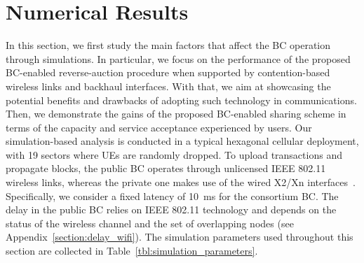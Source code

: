 \documentclass[conference]{IEEEtran}
\theoremstyle{definition}
\begin{document}

\section{Numerical Results}
\label{section:results}

In this section, we first study the main factors that affect the BC operation through simulations. In particular, we focus on the performance of the proposed BC-enabled reverse-auction procedure when supported by contention-based wireless links and backhaul interfaces. With that, we aim at showcasing the potential benefits and drawbacks of adopting such technology in communications. Then, we demonstrate the gains of the proposed BC-enabled sharing scheme in terms of the capacity and service acceptance experienced by users. Our simulation-based analysis is conducted in a typical hexagonal cellular deployment, with 19 sectors
where UEs are randomly dropped. To upload transactions and propagate blocks, the public BC operates through unlicensed IEEE 802.11 wireless links, whereas the private one makes use of the wired X2/Xn interfaces~\cite{assefa2017sdn}. Specifically, we consider a fixed latency of 10~ms for the consortium BC. The delay in the public BC relies on IEEE 802.11 technology and depends on the status of the wireless channel and the set of overlapping nodes (see Appendix~\ref{section:delay_wifi}). The simulation parameters used throughout this section are collected in Table~\ref{tbl:simulation_parameters}. 
\end{document}

